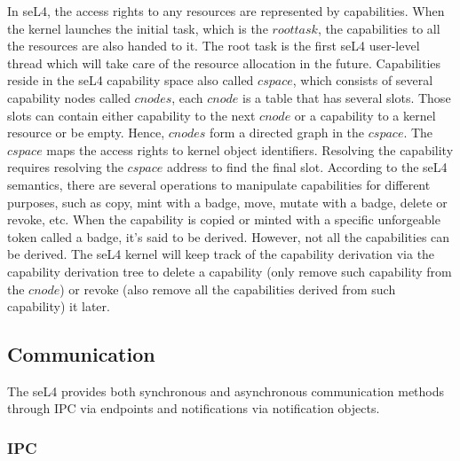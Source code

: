 In seL4, the access rights to any resources are represented by capabilities. When the kernel launches the initial task, which is the $root task$, the capabilities to all the resources are also handed to it. The root task is the first seL4 user-level thread which will take care of the resource allocation in the future. Capabilities reside in the seL4 capability space also called $cspace$, which consists of several capability nodes called $cnodes$, each $cnode$ is a table that has several slots. Those slots can contain either capability to the next $cnode$ or a capability to a kernel resource or be empty. Hence, $cnodes$ form a directed graph in the $cspace$. The $cspace$ maps the access rights to kernel object identifiers. Resolving the capability requires resolving the $cspace$ address to find the final slot. According to the seL4 semantics, there are several operations to manipulate capabilities for different purposes, such as copy, mint with a badge, move, mutate with a badge, delete or revoke, etc. When the capability is copied or minted with a specific unforgeable token called a badge, it's said to be derived. However, not all the capabilities can be derived. The seL4 kernel will keep track of the capability derivation via the capability derivation tree to delete a capability (only remove such capability from the $cnode$) or revoke (also remove all the capabilities derived from such capability) it later.

\subsection{Communication}

The seL4 provides both synchronous and asynchronous communication methods through IPC via endpoints and notifications via notification objects. 

\subsubsection{IPC}

